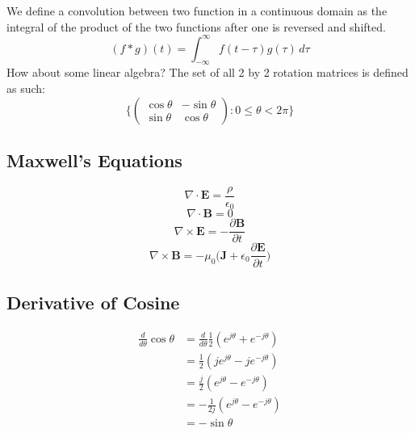 \documentclass{article}
\begin{document}
  \newpage
  We define a convolution between two function in a continuous domain as the
  integral of the product of the two functions after one is reversed and
  shifted.
  \[
    (f*g)(t) = \int_{-\infty}^\infty f(t-\tau)g(\tau)\, d\tau
  \]
  How about some linear algebra? The set of all 2 by 2 rotation matrices is 
  defined as such:
  \[
    \bigg\{ 
    \begin{pmatrix}
        \cos\theta & -\sin\theta \\
        \sin\theta & \cos\theta
    \end{pmatrix}: 0 \leq \theta < 2\pi
    \bigg\}
  \]

  \subsection{Maxwell's Equations}

  \[
      \nabla\cdot\mathbf{E} = \frac{\rho}{\epsilon_0}
  \]
  \[
      \nabla\cdot\mathbf{B} = 0
  \]
  \[
      \nabla\times\mathbf{E} = -\frac{\partial\mathbf{B}}{\partial t}
  \]
  \[
      \nabla\times\mathbf{B} 
      = -\mu_0\bigg(\mathbf{J}
      +\epsilon_0\frac{\partial\mathbf{E}}{\partial t}\bigg)
  \]

\subsection*{Derivative of Cosine}

\begin{align*}
  \frac{d}{d\theta}\cos\theta
  &=\frac{d}{d\theta}\frac12(e^{j\theta} + e^{-j\theta})\\
  &=\frac12(je^{j\theta}-je^{-j\theta})\\
  &=\frac{j}2(e^{j\theta}-e^{-j\theta})\\
  &=-\frac1{2j}(e^{j\theta}-e^{-j\theta})\\
  &=-\sin\theta
\end{align*}
\end{document}
